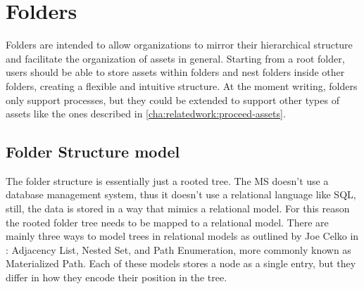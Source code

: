 
%

\section{Folders}
\label{cha:conceptanddesign:folders}

Folders are intended to allow organizations to mirror their hierarchical structure and
facilitate the organization of assets in general.
Starting from a root folder, users should be able to store assets within folders and nest
folders inside other folders, creating a flexible and intuitive structure. 
At the moment writing, folders only support processes, but they could be extended to
support other types of assets like the ones described in \ref{cha:relatedwork:proceed-assets}.

\subsection{Folder Structure model}


The folder structure is essentially just a rooted tree.
The MS doesn't use a database management system, thus it doesn't use a relational
language like SQL, still, the data is stored in a way that mimics a relational model.
For this reason the rooted folder tree needs to be mapped to a relational model.
%
There are mainly three ways to model trees in relational models as outlined by Joe Celko in
\cite{celkoSQLTrees}: Adjacency List, Nested Set, and  Path Enumeration, more commonly known as Materialized Path.
Each of these models stores a node as a single entry, but they differ in how they encode
their position in the tree.

